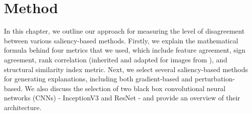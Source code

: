 \chapter{Method}
\label{ch:proposedMethod}
In this chapter, we outline our approach for measuring the level of disagreement between various saliency-based methods. Firstly, we explain the mathematical formula behind four metrics that we used, which include feature agreement, sign agreement, rank correlation (inherited and adapted for images from \cite{krishna_disagreement_problem}), and structural similarity index metric. Next, we select several saliency-based methods for generating explanations, including both gradient-based and perturbation-based. We also discuss the selection of two black box convolutional neural networks (CNNs) - InceptionV3 and ResNet - and provide an overview of their architecture.




